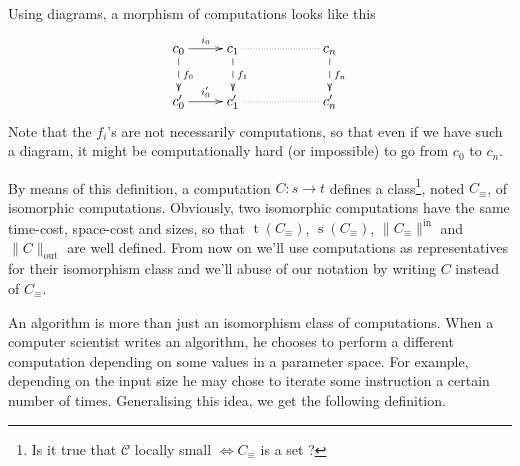\documentclass{article}
\newcommand{\cat}[1]{\mathscr{#1}}
\newcommand{\C}{\cat{C}}
\newcommand{\size}[1]{\lVert#1\rVert}
\newcommand{\sizein}[1]{\size{#1}^\mathrm{in}}
\newcommand{\sizeout}[1]{\size{#1}_\mathrm{out}}
\newcommand{\ra}{\rightarrow}
\DeclareMathOperator{\Time}{t}
\DeclareMathOperator{\Space}{s}
\newtheorem{definition}{Definition}
\begin{document}
  Using diagrams, a morphism of computations looks like this
  \[\xymatrix{
    c_0 \ar[r]^{i_0} \ar@{-->}[d]^{f_0} & c_1 \ar@{-->}[d]^{f_1} \ar@{.}[rr] && c_n\ar@{-->}[d]^{f_n}\\
    c_0' \ar[r]^{i_0'} & c_1' \ar@{.}[rr] && c_n'
  }\]
  Note that the $f_i$'s are not necessarily computations, so that even
  if we have such a diagram, it might be computationally hard (or
  impossible) to go from $c_0$ to $c_n$.
  
  By means of this definition, a computation $C:s\ra t$ defines a
  class\footnote{Is it true that $\C$ locally small $\Leftrightarrow
    C_\equiv$ is a set ?}, noted $C_\equiv$, of isomorphic
  computations. Obviously, two isomorphic computations have the same
  time-cost, space-cost and sizes, so that $\Time(C_\equiv)$,
  $\Space(C_\equiv)$, $\sizein{C_\equiv}$ and $\sizeout{C}$ are well
  defined. From now on we'll use computations as representatives for
  their isomorphism class and we'll abuse of our notation by writing
  $C$ instead of $C_\equiv$.
  
  


  An algorithm is more than just an isomorphism class of
  computations. When a computer scientist writes an algorithm, he
  chooses to perform a different computation depending on some values
  in a parameter space. For example, depending on the input size he
  may chose to iterate some instruction a certain number of
  times. Generalising this idea, we get the following definition.
\end{document}
